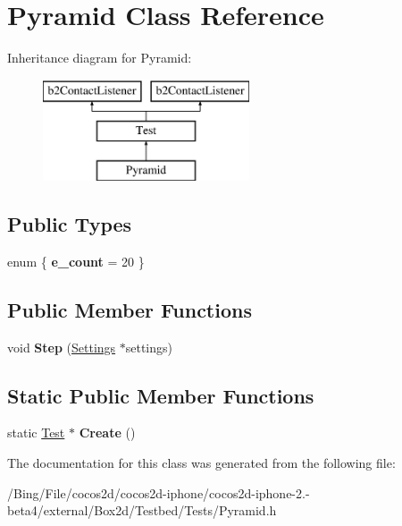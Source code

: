 \hypertarget{class_pyramid}{\section{Pyramid Class Reference}
\label{class_pyramid}
}
Inheritance diagram for Pyramid\-:\begin{figure}[H]
\begin{center}
\leavevmode
\includegraphics[height=3.000000cm]{class_pyramid}
\end{center}
\end{figure}
\subsection*{Public Types}
\begin{DoxyCompactItemize}
\item 
enum \{ {\bfseries e\-\_\-count} =  20
 \}
\end{DoxyCompactItemize}
\subsection*{Public Member Functions}
\begin{DoxyCompactItemize}
\item 
\hypertarget{class_pyramid_a53e261c396d425589ed7bc04f1219b73}{void {\bfseries Step} (\hyperlink{struct_settings}{Settings} $\ast$settings)}\label{class_pyramid_a53e261c396d425589ed7bc04f1219b73}

\end{DoxyCompactItemize}
\subsection*{Static Public Member Functions}
\begin{DoxyCompactItemize}
\item 
\hypertarget{class_pyramid_aa846a623f39fea3df31727ae5cb684f1}{static \hyperlink{class_test}{Test} $\ast$ {\bfseries Create} ()}\label{class_pyramid_aa846a623f39fea3df31727ae5cb684f1}

\end{DoxyCompactItemize}


The documentation for this class was generated from the following file\-:\begin{DoxyCompactItemize}
\item 
/\-Bing/\-File/cocos2d/cocos2d-\/iphone/cocos2d-\/iphone-\/2.-\/beta4/external/\-Box2d/\-Testbed/\-Tests/Pyramid.\-h\end{DoxyCompactItemize}
